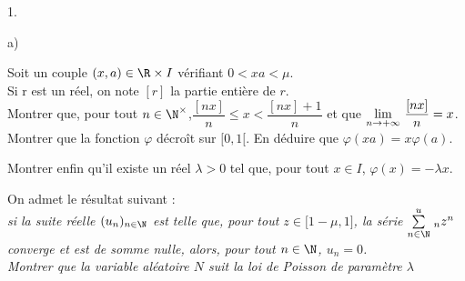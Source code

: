 \documentclass[11pt]{article}%
\begin{document}
\begin{noliste}{1.}
\begin{noliste}{a)}
\item Soit un couple $(x,a)\in \R\times I$ vérifiant $0<xa<\mu $.\\
Si r est un réel, on note $\left[ r\right] $ la partie entière de
$r$.\\
Montrer que, pour tout $n\in \N^{\times }$,\quad ${\dfrac{\left[
nx\right] }{n}}\leq x<{\dfrac{\left[ nx\right] + 1}{n}}$ et que
${\displaystyle \lim_{n\rightarrow + \infty } \ }{\dfrac{\left[ nx\right] }{n}} = x$.\\
Montrer que la fonction $\varphi $ décro{î}t sur $[0,1[$. En déduire
que $\varphi (xa) = x\varphi (a)$.

\item Montrer enfin qu'il existe un réel $\lambda >0$ tel que, pour
tout $x\in I$, $\varphi (x) = -\lambda x$.
\end{noliste}

\item On admet le résultat suivant :\\
\textsl{si la suite réelle $(u_{n})_{n\in \N}$ est telle que, pour
tout $z\in \lbrack 1-\mu,1]$, la série $\Sum{n\in \N}u_{n}z^{n}$
converge et est de somme nulle, alors, pour tout $n\in \N$, $u_{n} =
0$. }\\
\textsl{Montrer que la variable aléatoire $N$ suit la loi de Poisson de
paramètre $\lambda $ }
\end{noliste}

\label{fin}
\end{document}

